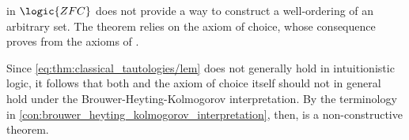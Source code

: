 \begin{example}\label{ex:con:brouwer_heyting_kolmogorov_interpretation/well_ordering_principle_zfc}
   in \hyperref[def:zfc]{\( \logic{ZFC} \)} does not provide a way to construct a well-ordering of an arbitrary set. The theorem relies on the axiom of choice, whose consequence  proves  from the axioms of .

  Since \eqref{eq:thm:classical_tautologies/lem} does not generally hold in intuitionistic logic, it follows that both  and the axiom of choice itself should not in general hold under the Brouwer-Heyting-Kolmogorov interpretation. By the terminology in \cref{con:brouwer_heyting_kolmogorov_interpretation}, then,  is a non-constructive theorem.
\end{example}

